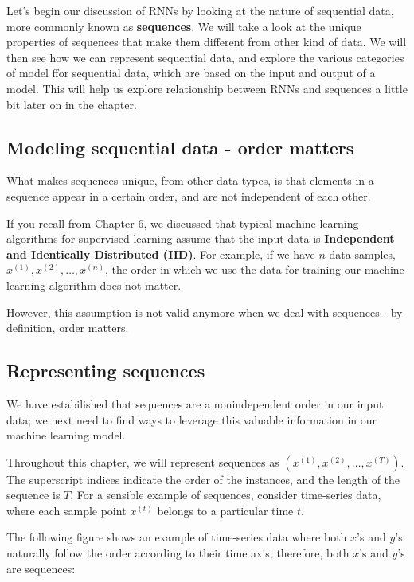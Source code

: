 \documentclass[11pt]{article}
\begin{document}
    Let's begin our discussion of RNNs by looking at the nature of
sequential data, more commonly known as \textbf{sequences}. We will take
a look at the unique properties of sequences that make them different
from other kind of data. We will then see how we can represent
sequential data, and explore the various categories of model ffor
sequential data, which are based on the input and output of a model.
This will help us explore relationship between RNNs and sequences a
little bit later on in the chapter.

    \subsection{Modeling sequential data - order
matters}\label{modeling-sequential-data---order-matters}

    What makes sequences unique, from other data types, is that elements in
a sequence appear in a certain order, and are not independent of each
other.

If you recall from Chapter 6, we discussed that typical machine learning
algorithms for supervised learning assume that the input data is
\textbf{Independent and Identically Distributed (IID)}. For example, if
we have \(n\) data samples, \(x^{(1)}, x^{(2)}, \ldots, x^{(n)}\), the
order in which we use the data for training our machine learning
algorithm does not matter.

However, this assumption is not valid anymore when we deal with
sequences - by definition, order matters.

    \subsection{Representing sequences}\label{representing-sequences}

    We have estabilished that sequences are a nonindependent order in our
input data; we next need to find ways to leverage this valuable
information in our machine learning model.

Throughout this chapter, we will represent sequences as
\((x^{(1)}, x^{(2)}, \ldots, x^{(T)})\). The superscript indices
indicate the order of the instances, and the length of the sequence is
\(T\). For a sensible example of sequences, consider time-series data,
where each sample point \(x^{(t)}\) belongs to a particular time \(t\).

The following figure shows an example of time-series data where both
\(x\)'s and \(y\)'s naturally follow the order according to their time
axis; therefore, both \(x\)'s and \(y\)'s are sequences:
\end{document}
